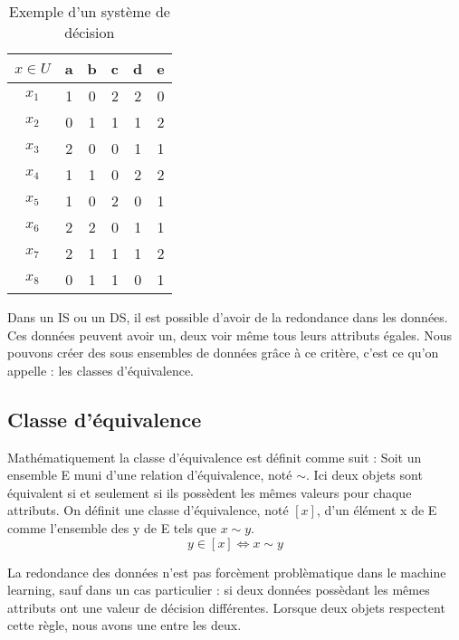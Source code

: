 \begin{table}[h!]
    \centering
    \begin{tabular}{|c||c|c|c|c||c|}
        \hline
        $x \in U$ & a & b & c & d & e \\
        \hline
        $x_1$     & 1 & 0 & 2 & 2 & 0 \\
        $x_2$     & 0 & 1 & 1 & 1 & 2 \\
        $x_3$     & 2 & 0 & 0 & 1 & 1 \\
        $x_4$     & 1 & 1 & 0 & 2 & 2 \\
        $x_5$     & 1 & 0 & 2 & 0 & 1 \\
        $x_6$     & 2 & 2 & 0 & 1 & 1 \\
        $x_7$     & 2 & 1 & 1 & 1 & 2 \\
        $x_8$     & 0 & 1 & 1 & 0 & 1 \\
        \hline
    \end{tabular}
    \caption{Exemple d'un système de décision}
    \label{tab:msysteme_decision}
\end{table}
Dans un IS ou un DS, il est possible d'avoir de la redondance
dans les données. Ces données peuvent avoir un, deux voir même
tous leurs attributs égales. Nous pouvons créer des sous ensembles
de données grâce à ce critère, c'est ce qu'on appelle : les classes
d'équivalence.

\subsection{Classe d'équivalence}
Mathématiquement la classe d'équivalence est définit comme suit :
Soit un ensemble E muni d'une relation d'équivalence, noté $\sim$.
Ici deux objets sont équivalent si et seulement si ils possèdent
les mêmes valeurs pour chaque attributs. On définit une classe
d'équivalence, noté $[x]$, d'un élément x de E comme l'ensemble
des y de E tels que $x \sim y$. \cite{wiki_relation_equivalence}
\begin{equation}
    y \in [x] \iff x \sim y
\end{equation}

La redondance des données n'est pas forcèment problèmatique dans le
machine learning, sauf dans un cas particulier : si deux données
possèdant les mêmes attributs ont une valeur de décision différentes.
Lorsque deux objets respectent cette règle, nous avons une
\ind entre les deux.

